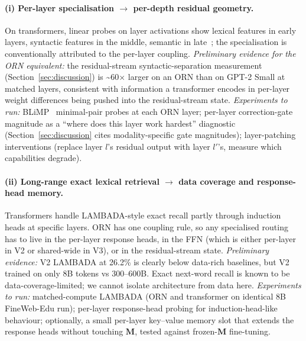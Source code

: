 \documentclass[10pt,twocolumn]{article}
\newcommand{\M}{\mathbf{M}}
\begin{document}
\paragraph{(i) Per-layer specialisation $\to$ per-depth residual geometry.}
On transformers, linear probes on layer activations show lexical features in early layers, syntactic features in the middle, semantic in late~\cite{hewitt2019probe}; the specialisation is conventionally attributed to the per-layer coupling.
\textit{Preliminary evidence for the ORN equivalent:} the residual-stream syntactic-separation measurement (Section~\ref{sec:discussion}) is \textasciitilde60$\times$ larger on an ORN than on GPT-2 Small at matched layers, consistent with information a transformer encodes in per-layer weight differences being pushed into the residual-stream state.
\textit{Experiments to run:} BLiMP~\cite{warstadt2020blimp} minimal-pair probes at each ORN layer; per-layer correction-gate magnitude as a ``where does this layer work hardest'' diagnostic (Section~\ref{sec:discussion} cites modality-specific gate magnitudes); layer-patching interventions (replace layer $l$'s residual output with layer $l'$'s, measure which capabilities degrade).

\paragraph{(ii) Long-range exact lexical retrieval $\to$ data coverage and response-head memory.}
Transformers handle LAMBADA-style exact recall partly through induction heads at specific layers.
ORN has one coupling rule, so any specialised routing has to live in the per-layer response heads, in the FFN (which is either per-layer in V2 or shared-wide in V3), or in the residual-stream state.
\textit{Preliminary evidence:} V2 LAMBADA at 26.2\% is clearly below data-rich baselines, but V2 trained on only 8B tokens vs 300--600B. Exact next-word recall is known to be data-coverage-limited; we cannot isolate architecture from data here.
\textit{Experiments to run:} matched-compute LAMBADA (ORN and transformer on identical 8B FineWeb-Edu run); per-layer response-head probing for induction-head-like behaviour; optionally, a small per-layer key--value memory slot that extends the response heads without touching $\M$, tested against frozen-$\M$ fine-tuning.
\end{document}
